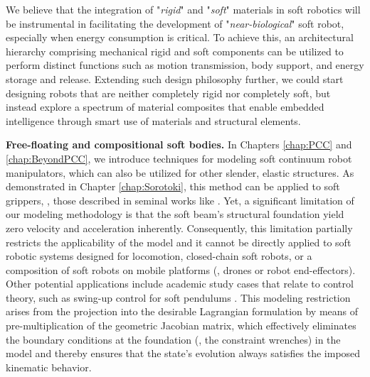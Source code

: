 We believe that the integration of "\textit{rigid}" and "\textit{soft}" materials in soft robotics will be instrumental in facilitating the development of "\textit{near-biological}" soft robot, especially when energy consumption is critical. To achieve this, an architectural hierarchy comprising mechanical rigid and soft components can be utilized to perform distinct functions such as motion transmission, body support, and energy storage and release. Extending such design philosophy further, we could start designing robots that are neither completely rigid nor completely soft, but instead explore a spectrum of material composites that enable embedded intelligence through smart use of materials and structural elements.

\textbf{Free-floating and compositional soft bodies.} In Chapters \ref{chap:PCC} and \ref{chap:BeyondPCC}, we introduce techniques for modeling soft continuum robot manipulators, which can also be utilized for other slender, elastic structures. As demonstrated in Chapter \ref{chap:Sorotoki}, this method can be applied to soft grippers, \eg, those described in seminal works like \cite{Sinatra2019Aug,Suzumori1992}. Yet, a significant limitation of our modeling methodology is that the soft beam's structural foundation yield zero velocity and acceleration inherently. Consequently, this limitation partially restricts the applicability of the model and it cannot be directly applied to soft robotic systems designed for locomotion, closed-chain soft robots, or a composition of soft robots on mobile platforms (\eg, drones or robot end-effectors). Other potential applications include academic study cases that relate to control theory, such as swing-up control for soft pendulums \cite{Weerakoon2021Dec,DellaSantina2020Dec}. This modeling restriction arises from the projection into the desirable Lagrangian formulation by means of pre-multiplication of the geometric Jacobian matrix, which effectively eliminates the boundary conditions at the foundation (\ie, the constraint wrenches) in the model and thereby ensures that the state's evolution always satisfies the imposed kinematic behavior.

